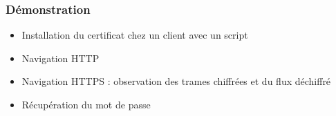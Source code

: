 \begin{frame}
\frametitle{Démonstration}
\begin{itemize}
\item Installation du certificat chez un client avec un script
\item Navigation HTTP
\item Navigation HTTPS : observation des trames chiffrées et du flux déchiffré
\item Récupération du mot de passe
\end{itemize}
\end{frame}
